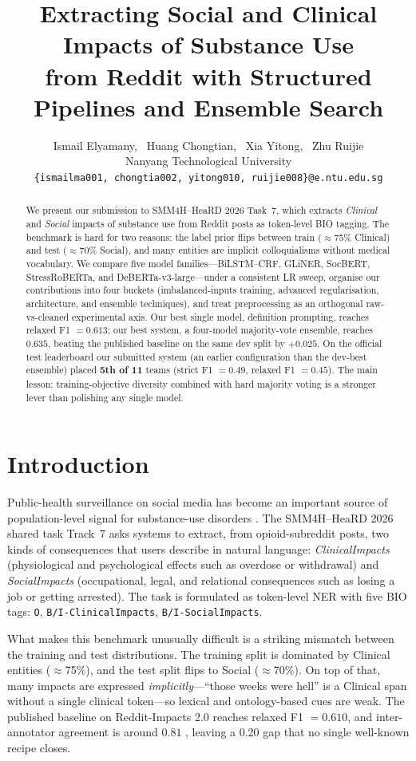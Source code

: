\documentclass[11pt]{article}
\title{Extracting Social and Clinical Impacts of Substance Use\\
from Reddit with Structured Pipelines and Ensemble Search}
\author{Ismail Elyamany, \ Huang Chongtian, \ Xia Yitong, \ Zhu Ruijie\\
Nanyang Technological University \\
\texttt{\{ismailma001, chongtia002, yitong010, ruijie008\}@e.ntu.edu.sg}
}
\begin{document}
\maketitle

\begin{abstract}
We present our submission to SMM4H--HeaRD 2026 Task~7, which extracts
\emph{Clinical} and \emph{Social} impacts of substance use from Reddit
posts as token-level BIO tagging. The benchmark is hard for two reasons:
the label prior flips between train ($\approx$75\% Clinical) and test
($\approx$70\% Social), and many entities are implicit colloquialisms
without medical vocabulary. We compare five model families---BiLSTM--CRF,
GLiNER, SocBERT, StressRoBERTa, and DeBERTa-v3-large---under a consistent
LR sweep, organise our contributions into four buckets (imbalanced-inputs
training, advanced regularisation, architecture, and ensemble
techniques), and treat preprocessing as an orthogonal raw-vs-cleaned
experimental axis. Our best single model, definition prompting, reaches
relaxed F1 $=0.613$; our best system, a four-model majority-vote
ensemble, reaches $0.635$, beating the published baseline on the same
dev split by $+0.025$. On the official test leaderboard our submitted
system (an earlier configuration than the dev-best ensemble) placed
\textbf{5th of 11} teams (strict F1 $=0.49$, relaxed F1 $=0.45$).
The main lesson: training-objective diversity combined with hard
majority voting is a stronger lever than polishing any single model.
\end{abstract}

\section{Introduction}

Public-health surveillance on social media has become an important source
of population-level signal for substance-use disorders
\citep{sarker2019social}. The SMM4H--HeaRD 2026 shared task Track~7 asks
systems to extract, from opioid-subreddit posts, two kinds of consequences
that users describe in natural language: \emph{ClinicalImpacts}
(physiological and psychological effects such as overdose or withdrawal)
and \emph{SocialImpacts} (occupational, legal, and relational consequences
such as losing a job or getting arrested). The task is formulated as
token-level NER with five BIO tags: \texttt{O}, \texttt{B/I-ClinicalImpacts},
\texttt{B/I-SocialImpacts}.

What makes this benchmark unusually difficult is a striking mismatch
between the training and test distributions. The training split is
dominated by Clinical entities ($\approx$75\%), and the test split flips
to Social ($\approx$70\%). On top of that, many impacts are expressed
\emph{implicitly}---``those weeks were hell'' is a Clinical span without
a single clinical token---so lexical and ontology-based cues are weak. The
published baseline on Reddit-Impacts 2.0 reaches relaxed F1 $= 0.610$,
and inter-annotator agreement is around $0.81$ \citep{dey2025reddit},
leaving a 0.20 gap that no single well-known recipe closes.
\end{document}
